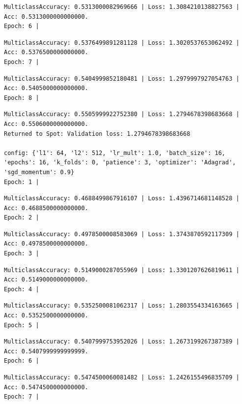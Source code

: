 \documentclass[
  letterpaper,
  DIV=11,
  numbers=noendperiod]{scrreprt}
\begin{document}
\begin{verbatim}
MulticlassAccuracy: 0.5313000082969666 | Loss: 1.3084210138827563 | Acc: 0.5313000000000000.
Epoch: 6 | 
\end{verbatim}

\begin{verbatim}
MulticlassAccuracy: 0.5376499891281128 | Loss: 1.3020537653062492 | Acc: 0.5376500000000000.
Epoch: 7 | 
\end{verbatim}

\begin{verbatim}
MulticlassAccuracy: 0.5404999852180481 | Loss: 1.2979997927054763 | Acc: 0.5405000000000000.
Epoch: 8 | 
\end{verbatim}

\begin{verbatim}
MulticlassAccuracy: 0.5505999922752380 | Loss: 1.2794678398683668 | Acc: 0.5506000000000000.
Returned to Spot: Validation loss: 1.2794678398683668

config: {'l1': 64, 'l2': 512, 'lr_mult': 1.0, 'batch_size': 16, 'epochs': 16, 'k_folds': 0, 'patience': 3, 'optimizer': 'Adagrad', 'sgd_momentum': 0.9}
Epoch: 1 | 
\end{verbatim}

\begin{verbatim}
MulticlassAccuracy: 0.4688499867916107 | Loss: 1.4396714681148528 | Acc: 0.4688500000000000.
Epoch: 2 | 
\end{verbatim}

\begin{verbatim}
MulticlassAccuracy: 0.4978500008583069 | Loss: 1.3743870592117309 | Acc: 0.4978500000000000.
Epoch: 3 | 
\end{verbatim}

\begin{verbatim}
MulticlassAccuracy: 0.5149000287055969 | Loss: 1.3301207626819611 | Acc: 0.5149000000000000.
Epoch: 4 | 
\end{verbatim}

\begin{verbatim}
MulticlassAccuracy: 0.5352500081062317 | Loss: 1.2803554334163665 | Acc: 0.5352500000000000.
Epoch: 5 | 
\end{verbatim}

\begin{verbatim}
MulticlassAccuracy: 0.5407999753952026 | Loss: 1.2673199267387389 | Acc: 0.5407999999999999.
Epoch: 6 | 
\end{verbatim}

\begin{verbatim}
MulticlassAccuracy: 0.5474500060081482 | Loss: 1.2426155496835709 | Acc: 0.5474500000000000.
Epoch: 7 | 
\end{verbatim}
\end{document}
